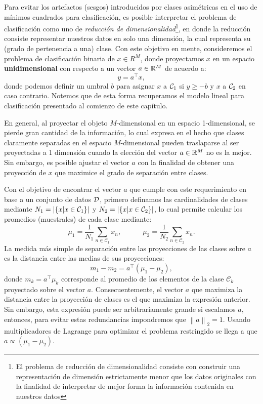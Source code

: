Para evitar los artefactos (sesgos) introducidos por clases  asimétricas en el uso de mínimos cuadrados para clasificación, es posible interpretar el problema de clasificación como uno de \emph{reducción de dimensionalidad}\footnote{El problema de reducción de dimensionalidad consiste con construir una representación de dimensión estrictamente menor que los datos originales con la finalidad de interpretar de mejor forma la información contenida en nuestros datos}, en donde la reducción consiste representar nuestros datos  en solo una dimensión, la cual representa su (grado de pertenencia a una) clase. Con este objetivo en mente, consideremos el problema de clasificación binaria de $x\in R^M$, donde proyectamos $x$ en un espacio \textbf{unidimensional} con respecto a un vector $a\in{\mathbb R}^M$ de acuerdo a:
\begin{equation}
	y = a^\top x,
\end{equation}
donde podemos definir un umbral $b$ para asignar $x$ a ${\mathcal C}_1$ si $y\geq-b$ y $x$ a ${\mathcal C}_2$ en caso contrario. Notemos que de esta forma recuperamos el modelo lineal para clasificación presentado al comienzo de este capítulo.

En general, al proyectar el objeto $M$-dimensional en un espacio  1-dimensional, se pierde gran cantidad de la información, lo cual expresa en el hecho que clases claramente separadas en el espacio $M$-dimensional pueden traslaparse al ser proyectadas a 1 dimensión cuando la elección del vector $a\in{\mathbb R}^M$ no es la mejor. Sin embargo, es posible ajustar el vector $a$ con la finalidad de obtener una proyección de $x$ que maximice el grado de separación entre clases.

Con el objetivo de encontrar el vector $a$ que cumple con este requerimiento en base a un conjunto de datos  ${\mathcal D}$, primero definamos las cardinalidades de clases mediante $N_1 = |\{x|x\in{\mathcal C}_1\}|$ y $N_2 = |\{x|x\in{\mathcal C}_2\}|$, lo cual permite calcular los promedios (muestrales) de cada  clase mediante: 
\begin{equation}
	\mu_1=\frac{1}{N_1}\sum_{n\in\mathcal{C}_1}x_n,
	\quad\quad\quad
	\mu_2=\frac{1}{N_2}\sum_{n\in\mathcal{C}_2}x_n.
\end{equation}
La medida más simple de separación entre las proyecciones de las clases sobre $a$ es la distancia entre las medias  de sus proyecciones:
\begin{equation}
	m_1 - m_2 = a^\top(\mu_1-\mu_2),
\end{equation}
donde $m_k= a^\top\mu_k$ corresponde al promedio de los elementos de  la clase $\mathcal{C}_k$ proyectado sobre el  vector $a$. Consecuentemente, el vector $a$ que maximiza la distancia entre la proyección de clases es el que maximiza la expresión anterior. Sin embargo, esta expresión puede ser arbitrariamente grande si escalamos $a$, entonces, para evitar estas redundancias impondremos que $\left \| a \right \|_2=1$. Usando multiplicadores de Lagrange para optimizar el problema restringido se llega a que $a\propto(\mu_1-\mu_2)$. 

